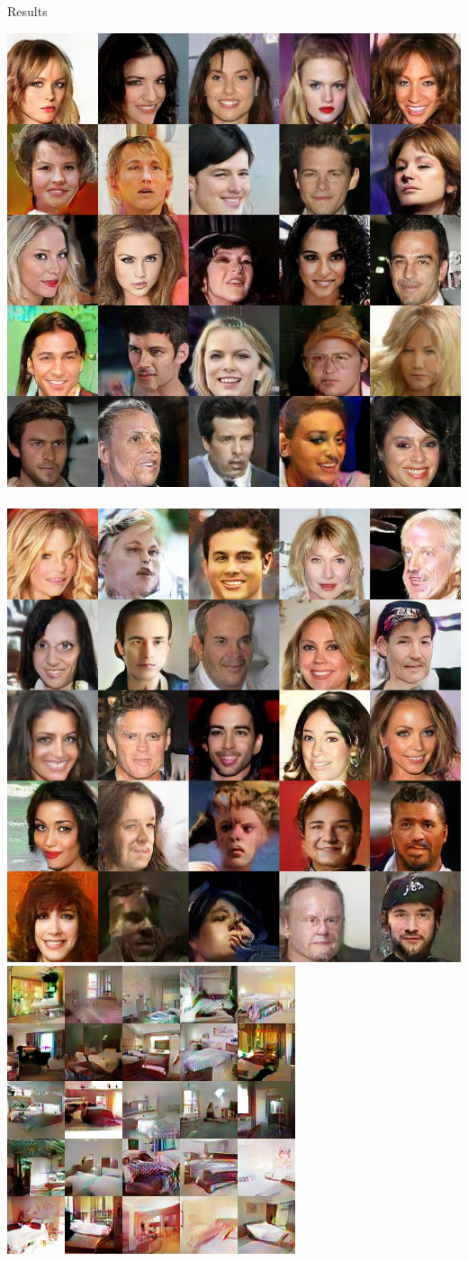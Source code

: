 \documentclass[xcolor={table}]{beamer}
\begin{document}
\begin{frame}{}
\begin{columns}[T, totalwidth=\textwidth]
\begin{column}{.32\textwidth}
\begin{block}{Results}
    \end{block}
    \vspace*{-1.3cm}
    \begin{sidefigure4}
      \centering
      \includegraphics[width=.49\columnwidth]{samples/celeba-mmd-rq-25.png}
      ~
      \includegraphics[width=.49\columnwidth]{samples/celeba-wgan-25.png}
      \vspace*{10pt}
      \includegraphics[width=.49\columnwidth]{samples/lsun_rq_16.png}

\end{sidefigure4}
\end{column}
\end{columns}
\end{frame}
\end{document}
